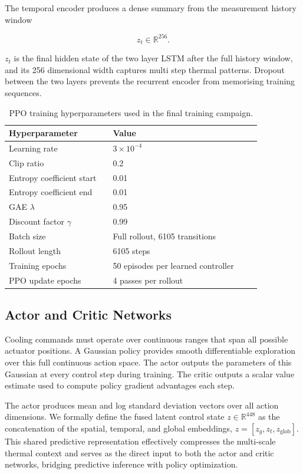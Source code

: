 \documentclass[twocolumn]{article}
\begin{document}
The temporal encoder produces a dense summary from the measurement history window

\begin{equation}
z_t \in \mathbb{R}^{256}.
\end{equation}

$z_t$ is the final hidden state of the two layer LSTM after the full history window, and its 256 dimensional width captures multi step thermal patterns. Dropout between the two layers prevents the recurrent encoder from memorising training sequences.

\begin{table}[!tb]
\centering
\caption{PPO training hyperparameters used in the final training campaign.}\label{tab:ppo_hyperparameters}
\small
\renewcommand{\arraystretch}{1.1}
\begin{tabular}{p{0.35\linewidth}p{0.5\linewidth}}
\hline
Hyperparameter & Value\\
\hline
Learning rate & $3 \times 10^{-4}$\\
Clip ratio & 0.2\\
Entropy coefficient start & 0.01\\
Entropy coefficient end & 0.01\\
GAE $\lambda$ & 0.95\\
Discount factor $\gamma$ & 0.99\\
Batch size & Full rollout, 6105 transitions\\
Rollout length & 6105 steps\\
Training epochs & 50 episodes per learned controller\\
PPO update epochs & 4 passes per rollout\\
\hline
\end{tabular}
\end{table}

\subsection*{Actor and Critic Networks}

Cooling commands must operate over continuous ranges that span all possible actuator positions. A Gaussian policy provides smooth differentiable exploration over this full continuous action space. The actor outputs the parameters of this Gaussian at every control step during training. The critic outputs a scalar value estimate used to compute policy gradient advantages each step.

The actor produces mean and log standard deviation vectors over all action dimensions. We formally define the fused latent control state $z \in \mathbb{R}^{448}$ as the concatenation of the spatial, temporal, and global embeddings, $z = [z_g, z_t, z_{\mathrm{glob}}]$. This shared predictive representation effectively compresses the multi-scale thermal context and serves as the direct input to both the actor and critic networks, bridging predictive inference with policy optimization.
\end{document}
